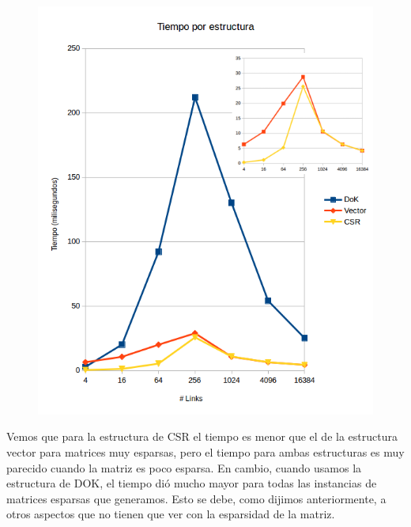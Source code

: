 \begin{figure}
  \vspace{-20pt}
  \begin{center}
    \includegraphics[scale=0.4]{imagenes/MedicionTiempoEstructura.png}
  \end{center}
  \vspace{-20pt}
  \vspace{-10pt}
  \label{fig:img1}
\end{figure}

Vemos que para la estructura de CSR el tiempo es menor que el de la estructura vector para matrices muy esparsas, pero el tiempo para ambas estructuras es muy parecido cuando la matriz es poco esparsa. En cambio, cuando usamos la estructura de DOK, el tiempo dió mucho mayor para todas las instancias de matrices esparsas que generamos. Esto se debe, como dijimos anteriormente, a otros aspectos que no tienen que ver con la esparsidad de la matriz.\\


